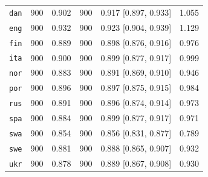 \begin{table}[htbp]
\begin{minipage}[t]{0.485\linewidth}
{\begin{tabular}{@{}lrrrrr@{}}
\texttt{dan} & 900 & 0.902 & 900 & 0.917 [0.897, 0.933] & 1.055 \\
\texttt{eng} & 900 & 0.932 & 900 & 0.923 [0.904, 0.939] & 1.129 \\
\texttt{fin} & 900 & 0.889 & 900 & 0.898 [0.876, 0.916] & 0.976 \\
\texttt{ita} & 900 & 0.900 & 900 & 0.899 [0.877, 0.917] & 0.999 \\
\texttt{nor} & 900 & 0.883 & 900 & 0.891 [0.869, 0.910] & 0.946 \\
\texttt{por} & 900 & 0.896 & 900 & 0.897 [0.875, 0.915] & 0.984 \\
\texttt{rus} & 900 & 0.891 & 900 & 0.896 [0.874, 0.914] & 0.973 \\
\texttt{spa} & 900 & 0.884 & 900 & 0.899 [0.877, 0.917] & 0.971 \\
\texttt{swa} & 900 & 0.854 & 900 & 0.856 [0.831, 0.877] & 0.789 \\
\texttt{swe} & 900 & 0.881 & 900 & 0.888 [0.865, 0.907] & 0.932 \\
\texttt{ukr} & 900 & 0.878 & 900 & 0.889 [0.867, 0.908] & 0.930 \\
\bottomrule
\end{tabular}}
\end{minipage}
\end{table}

